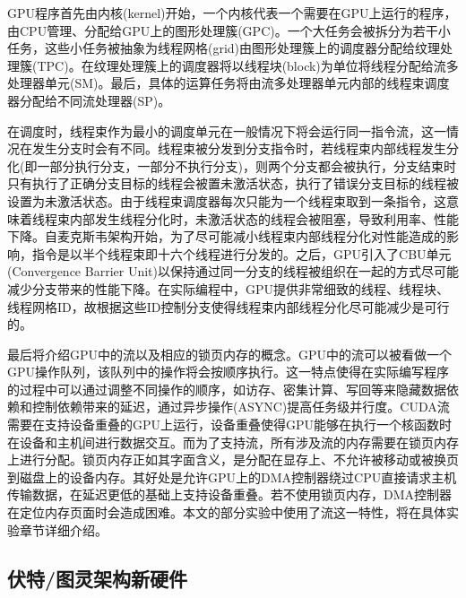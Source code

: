 \par GPU程序首先由内核(kernel)开始，一个内核代表一个需要在GPU上运行的程序，由CPU管理、分配给GPU上的图形处理簇(GPC)。一个大任务会被拆分为若干小任务，这些小任务被抽象为线程网格(grid)由图形处理簇上的调度器分配给纹理处理簇(TPC)。在纹理处理簇上的调度器将以线程块(block)为单位将线程分配给流多处理器单元(SM)。最后，具体的运算任务将由流多处理器单元内部的线程束调度器分配给不同流处理器(SP)。
\par 在调度时，线程束作为最小的调度单元在一般情况下将会运行同一指令流，这一情况在发生分支时会有不同。线程束被分发到分支指令时，若线程束内部线程发生分化(即一部分执行分支，一部分不执行分支)，则两个分支都会被执行，分支结束时只有执行了正确分支目标的线程会被置未激活状态，执行了错误分支目标的线程被设置为未激活状态。由于线程束调度器每次只能为一个线程束取到一条指令，这意味着线程束内部发生线程分化时，未激活状态的线程会被阻塞，导致利用率、性能下降。自麦克斯韦架构开始，为了尽可能减小线程束内部线程分化对性能造成的影响，指令是以半个线程束即十六个线程进行分发的。之后，GPU引入了CBU单元(Convergence Barrier Unit)以保持通过同一分支的线程被组织在一起的方式尽可能减少分支带来的性能下降\parencite{THREADS}。在实际编程中，GPU提供非常细致的线程、线程块、线程网格ID，故根据这些ID控制分支使得线程束内部线程分化尽可能减少是可行的\parencite{DIVER}。
\par 最后将介绍GPU中的流以及相应的锁页内存的概念。GPU中的流可以被看做一个GPU操作队列，该队列中的操作将会按顺序执行。这一特点使得在实际编写程序的过程中可以通过调整不同操作的顺序，如访存、密集计算、写回等来隐藏数据依赖和控制依赖带来的延迟\parencite{STREAM}，通过异步操作(ASYNC)提高任务级并行度。CUDA流需要在支持设备重叠的GPU上运行，设备重叠使得GPU能够在执行一个核函数时在设备和主机间进行数据交互。而为了支持流，所有涉及流的内存需要在锁页内存上进行分配。锁页内存正如其字面含义，是分配在显存上、不允许被移动或被换页到磁盘上的设备内存。其好处是允许GPU上的DMA控制器绕过CPU直接请求主机传输数据，在延迟更低的基础上支持设备重叠\parencite{PAGELOCK}。若不使用锁页内存，DMA控制器在定位内存页面时会造成困难。本文的部分实验中使用了流这一特性，将在具体实验章节详细介绍。
\subsection{伏特/图灵架构新硬件}     
